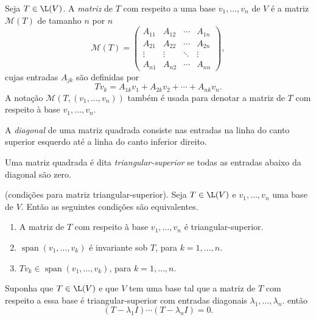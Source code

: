 \documentclass{article}
\DeclareMathOperator{\spn}{span}
\begin{document}
\begin{defn}
    Seja \(T \in \L(V)\). A \emph{matriz} de \(T\) com respeito a uma base \(v_1, \ldots, v_n\) de \(V\) é a matriz \(\mathcal{M}(T)\) de tamanho \(n\) por \(n\)
    \[
    \mathcal{M}(T) = \begin{pmatrix}
        A_{11} & A_{12} & \cdots & A_{1n} \\
        A_{21} & A_{22} & \cdots & A_{2n} \\
        \vdots & \vdots & \ddots & \vdots \\
        A_{n1} & A_{n2} & \cdots & A_{nn}
    \end{pmatrix},
    \]
    \noindent cujas entradas \(A_{jk}\) são definidas por
    \[
        Tv_k = A_{1k} v_1 + A_{2k} v_2 + \cdots + A_{nk} v_n.
    \]
    A notação \(\mathcal{M}(T, (v_1, \ldots, v_n))\) também é usada para denotar a matriz de \(T\) com respeito à base \(v_1, \ldots, v_n\).
\end{defn}

\begin{defn}
    A \emph{diagonal} de uma matriz quadrada consiste nas entradas na linha do canto superior esquerdo até a linha do canto inferior direito.
\end{defn}

\begin{defn}
    Uma matriz quadrada é dita \emph{triangular-superior} se todas as entradas abaixo da diagonal são zero.
\end{defn}

\begin{prop} (condições para matriz triangular-superior).
    Seja \(T \in \L(V)\) e \(v_1, \ldots, v_n\) uma base de \(V\). Então as seguintes condições são equivalentes.
    \begin{enumerate}
        \item[(a)] A matriz de \(T\) com respeito à base \(v_1, \ldots, v_n\) é triangular-superior.
        \item[(b)] \(\spn(v_1, \ldots, v_k)\) é invariante sob \(T\), para \(k = 1, \ldots, n\).
        \item[(c)] \(Tv_k \in \spn(v_1, \ldots, v_k)\), para \(k = 1, \ldots, n\).
    \end{enumerate}
\end{prop}

\begin{prop}
    Suponha que \(T \in \L(V)\) e que \(V\) tem uma base tal que a matriz de \(T\) com respeito a essa base é triangular-superior com entradas diagonais \(\lambda_1, \ldots, \lambda_n\). então
    \[
        (T - \lambda_1I)\cdots(T - \lambda_n I) = 0.
    \]
\end{prop}
\end{document}
